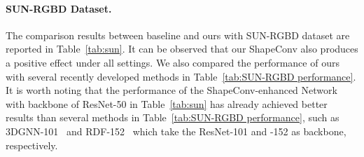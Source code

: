 \vspace{-0.4cm}
\begin{table}[h!]
 
   \caption{
        \label{tab:NYUDv2-40 performance}
        Performance comparison with other methods on NYUDv2-40 dataset.}
     \centering


\end{table} 


\paragraph{SUN-RGBD Dataset.}
The comparison results between baseline and ours with SUN-RGBD dataset are reported in Table~\ref{tab:sun}. It can be observed that our ShapeConv also produces a positive effect under all settings. We also compared the performance of ours with several recently developed methods in Table~\ref{tab:SUN-RGBD performance}. It is worth noting that the performance of the ShapeConv-enhanced Network with backbone of ResNet-50 in Table~\ref{tab:sun} has already achieved better results than several methods in Table~\ref{tab:SUN-RGBD performance}, such as 3DGNN-101~\cite{qi20173d} and RDF-152~\cite{park2017rdfnet} which take the ResNet-101 and -152 as backbone, respectively.


